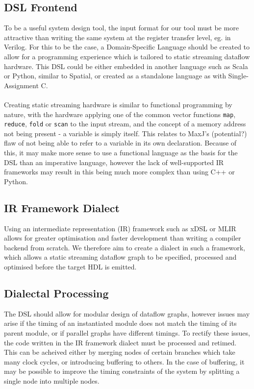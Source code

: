 \subsection{DSL Frontend}
To be a useful system design tool, the input format for our tool must be more attractive than writing the same system at the register transfer level, eg. in Verilog. For this to be the case, a Domain-Specific Language should be created to allow for a programming experience which is tailored to static streaming dataflow hardware. This DSL could be either embedded in another language such as Scala or Python, similar to Spatial, or created as a standalone language as with Single-Assignment C.
\\~\\
Creating static streaming hardware is similar to functional programming by nature, with the hardware applying one of the common vector functions \lstinline|map|, \lstinline|reduce|, \lstinline|fold| or \lstinline|scan| to the input stream, and the concept of a memory address not being present - a variable is simply itself. This relates to MaxJ's (potential?) flaw of not being able to refer to a variable in its own declaration. Because of this, it may make more sense to use a functional language as the basis for the DSL than an imperative language, however the lack of well-supported IR frameworks may result in this being much more complex than using C++ or Python.

\subsection{IR Framework Dialect}
Using an intermediate representation (IR) framework such as xDSL \cite{xdsl-home} or MLIR \cite{mlir} allows for greater optimisation and faster development than writing a compiler backend from scratch. We therefore aim to create a dialect in such a framework, which allows a static streaming dataflow graph to be specified, processed and optimised before the target HDL is emitted.

\subsection{Dialectal Processing}
The DSL should allow for modular design of dataflow graphs, however issues may arise if the timing of an instantiated module does not match the timing of its parent module, or if parallel graphs have different timings. To rectify these issues, the code written in the IR framework dialect must be processed and retimed. This can be acheived either by merging nodes of certain branches which take many clock cycles, or introducing buffering to others. In the case of buffering, it may be possible to improve the timing constraints of the system by splitting a single node into multiple nodes.

